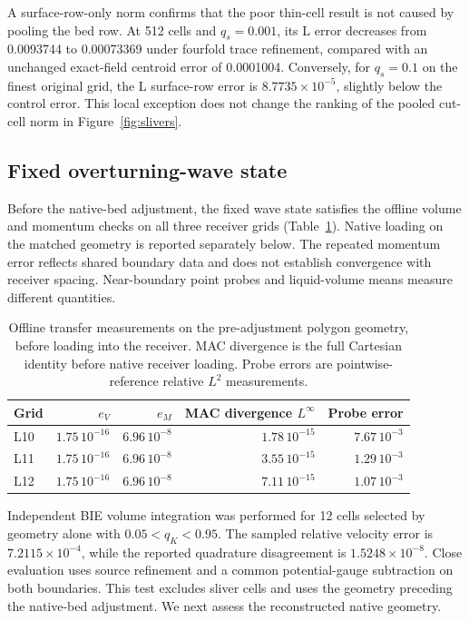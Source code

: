 \documentclass[10pt]{article}
\begin{document}
A surface-row-only norm confirms that the poor thin-cell result is not
caused by pooling the bed row. At 512 cells and
$q_s=0.001$, its L error decreases from 0.0093744 to 0.00073369
under fourfold trace refinement, compared with an unchanged exact-field centroid
error of 0.0001004. Conversely, for $q_s=0.1$ on the finest original grid,
the L surface-row error is $8.7735\times10^{-5}$, slightly below the
control error. This local exception does not change the ranking of the
pooled cut-cell norm in Figure~\ref{fig:slivers}.

\subsection{Fixed overturning-wave state}
Before the native-bed adjustment, the fixed wave state satisfies the
offline volume and momentum checks on all three receiver grids
(Table~\ref{tab:transfer}). Native loading on the matched geometry is
reported separately below. The repeated momentum error reflects shared
boundary data and does not establish convergence with receiver spacing.
Near-boundary point probes and liquid-volume means measure different quantities.

\begin{table}[htbp]\centering\small
\caption{Offline transfer measurements on the pre-adjustment polygon
geometry, before loading into the receiver.
MAC divergence is the full Cartesian
identity before native receiver loading. Probe errors are pointwise-reference
relative $L^2$ measurements.}\label{tab:transfer}
\begin{tabular}{lrrrr}\toprule
Grid & $e_V$ & $e_M$ & MAC divergence $L^\infty$ & Probe error\\\midrule
L10 & $1.75\,10^{-16}$ & $6.96\,10^{-8}$ & $1.78\,10^{-15}$ & $7.67\,10^{-3}$\\
L11 & $1.75\,10^{-16}$ & $6.96\,10^{-8}$ & $3.55\,10^{-15}$ & $1.29\,10^{-3}$\\
L12 & $1.75\,10^{-16}$ & $6.96\,10^{-8}$ & $7.11\,10^{-15}$ & $1.07\,10^{-3}$\\
\bottomrule\end{tabular}
\end{table}

Independent BIE volume integration was performed for 12 cells selected by
geometry alone with $0.05<q_K<0.95$. The sampled relative velocity
error is $7.2115\times10^{-4}$, while the reported quadrature disagreement is
$1.5248\times10^{-8}$. Close evaluation uses source refinement and a common
potential-gauge subtraction on both boundaries. This test excludes sliver
cells and uses the geometry preceding the native-bed adjustment. We next
assess the reconstructed native geometry.
\end{document}
